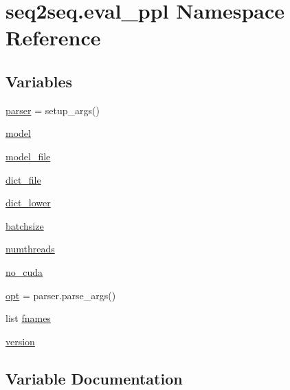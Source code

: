 \hypertarget{namespaceseq2seq_1_1eval__ppl}{}\section{seq2seq.\+eval\+\_\+ppl Namespace Reference}
\label{namespaceseq2seq_1_1eval__ppl}
\subsection*{Variables}
\begin{DoxyCompactItemize}
\item 
\hyperlink{namespaceseq2seq_1_1eval__ppl_af74afb56980c3fda3ba6bba37ef8605c}{parser} = setup\+\_\+args()
\item 
\hyperlink{namespaceseq2seq_1_1eval__ppl_aaea0ca1061913ae2d28319ea665002e6}{model}
\item 
\hyperlink{namespaceseq2seq_1_1eval__ppl_a9e46e9143b30416b473c86c8bc0bec07}{model\+\_\+file}
\item 
\hyperlink{namespaceseq2seq_1_1eval__ppl_a8e51dc79b933db93477b074202a513c2}{dict\+\_\+file}
\item 
\hyperlink{namespaceseq2seq_1_1eval__ppl_a041fa6e6c360c4c134d4e42ea6c93a0f}{dict\+\_\+lower}
\item 
\hyperlink{namespaceseq2seq_1_1eval__ppl_ac64d8763465c6eaddd9237798248387d}{batchsize}
\item 
\hyperlink{namespaceseq2seq_1_1eval__ppl_a57fedbf067c41a56463cf132c8a1a7ea}{numthreads}
\item 
\hyperlink{namespaceseq2seq_1_1eval__ppl_aa138bc9c8f151713a9e70350763b081f}{no\+\_\+cuda}
\item 
\hyperlink{namespaceseq2seq_1_1eval__ppl_ac9aef8e1b7b3bdebb8796c357f2b106d}{opt} = parser.\+parse\+\_\+args()
\item 
list \hyperlink{namespaceseq2seq_1_1eval__ppl_a5b8c807c7d254f234a56e4e0b1039578}{fnames}
\item 
\hyperlink{namespaceseq2seq_1_1eval__ppl_a5ce98aa272398ba396f59de6da776cbe}{version}
\end{DoxyCompactItemize}


\subsection{Variable Documentation}
\mbox{\label{namespaceseq2seq_1_1eval__ppl_ac64d8763465c6eaddd9237798248387d}} 
